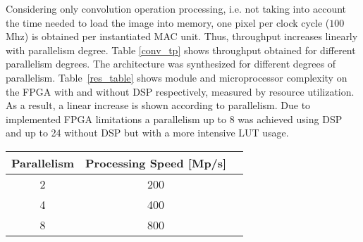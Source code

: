 \documentclass[a1paper,portrait,fontscale=0.43]{baposter}
\begin{document}
\begin{poster}
{\begin{multicols}{2}
Considering only convolution operation processing, i.e. not taking into account
the time needed to load the image into memory, one pixel per clock cycle ($100$ Mhz) is
obtained per instantiated MAC unit. Thus, throughput increases linearly with
parallelism degree. Table \ref{conv_tp} shows throughput obtained for
different parallelism degrees.
The architecture was synthesized for different degrees of parallelism.
Table~\ref{res_table} shows module and microprocessor complexity
on the FPGA with and without DSP respectively, measured by resource utilization. As a result, a linear increase is
shown according to parallelism. Due to implemented FPGA limitations a
parallelism up to 8 was achieved using DSP and up to 24 without DSP but with a
more intensive LUT usage.


\begin{center}
\begin{tabular}{|c|c|c|}
\hline
\textbf{Parallelism}  &    \textbf{Processing Speed [Mp/s]}  \\ \hline
        2             &                     200              \\ \hline
        4             &                     400              \\ \hline
        8             &                     800              \\ \hline
\end{tabular}           
\label{conv_tp}
\end{center}


\end{multicols}}
\end{poster}
\end{document}
